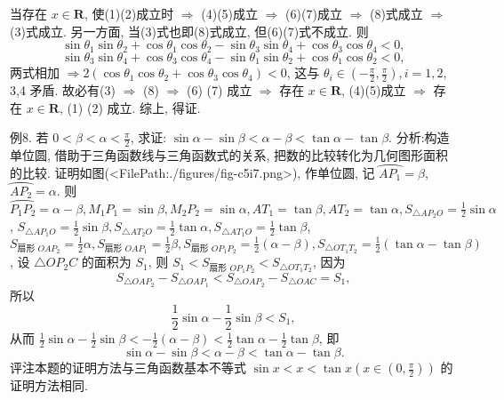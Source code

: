 当存在 $x \in \mathbf{R}$, 使(1)(2)成立时 $\Rightarrow$ (4)(5)成立 $\Rightarrow$ (6)(7)成立 $\Rightarrow$ (8)式成立 $\Rightarrow$ (3)式成立.
另一方面, 当(3)式也即(8)式成立, 但(6)(7)式不成立.
则
$$
\sin \theta_1 \sin \theta_2+\cos \theta_1 \cos \theta_2-\sin \theta_3 \sin \theta_4+\cos \theta_3 \cos \theta_4<0,
$$
$$
\sin \theta_3 \sin \theta_4+\cos \theta_3 \cos \theta_4-\sin \theta_1 \sin \theta_2+\cos \theta_1 \cos \theta_2<0,
$$
两式相加 $\Rightarrow 2\left(\cos \theta_1 \cos \theta_2+\cos \theta_3 \cos \theta_4\right)<0$, 这与 $\theta_i \in\left(-\frac{\pi}{2}, \frac{\pi}{2}\right), i=1,2$, 3,4 矛盾.
故必有(3) $\Rightarrow$ (8) $\Rightarrow$ (6) (7) 成立 $\Rightarrow$ 存在 $x \in \mathbf{R}$, (4)(5)成立 $\Rightarrow$ 存在 $x \in \mathbf{R}$, (1) (2) 成立.
综上, 得证.



例8. 若 $0<\beta<\alpha<\frac{\pi}{2}$, 求证: $\sin \alpha-\sin \beta<\alpha-\beta<\tan \alpha-\tan \beta$.
分析:构造单位圆, 借助于三角函数线与三角函数式的关系, 把数的比较转化为几何图形面积的比较.
证明如图(<FilePath:./figures/fig-c5i7.png>), 作单位圆, 记 $\overparen{A P_1}=\beta$, $\overparen{A P_2}=\alpha$. 则 $\overparen{P_1 P_2}=\alpha-\beta, M_1 P_1=\sin \beta, M_2 P_2= \sin \alpha, A T_1=\tan \beta, A T_2=\tan \alpha, S_{\triangle A P_2 O}=\frac{1}{2} \sin \alpha$, $S_{\triangle A P_1 O}=\frac{1}{2} \sin \beta, S_{\triangle A T_2 O}=\frac{1}{2} \tan \alpha, S_{\triangle A T_1 O}=\frac{1}{2} \tan \beta$, $S_{\text {扇形 } O A P_2}=\frac{1}{2} \alpha, S_{\text {扇形 } O A P_1}=\frac{1}{2} \beta, S_{\text {扇形 } O P_1 P_2}=\frac{1}{2}(\alpha- \beta), S_{\triangle O T_1 T_2}=\frac{1}{2}(\tan \alpha-\tan \beta)$, 设 $\triangle O P_2 C$ 的面积为 $S_1$, 则 $S_1<S_{\text {扇形 } O P_1 P_2}<S_{\triangle O T_1 T_2}$, 因为
$$
S_{\triangle O A P_2}-S_{\triangle O A P_1}<S_{\triangle O A P_2}-S_{\triangle O A C}=S_1,
$$
所以
$$
\frac{1}{2} \sin \alpha-\frac{1}{2} \sin \beta<S_1,
$$
从而 $\frac{1}{2} \sin \alpha-\frac{1}{2} \sin \beta<-\frac{1}{2}(\alpha-\beta)<\frac{1}{2} \tan \alpha-\frac{1}{2} \tan \beta$, 即
$$
\sin \alpha-\sin \beta<\alpha-\beta<\tan \alpha-\tan \beta .
$$
评注本题的证明方法与三角函数基本不等式 $\sin x<x<\tan x\left(x \in \left(0, \frac{\pi}{2}\right)\right)$ 的证明方法相同.



